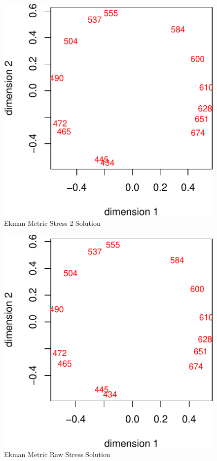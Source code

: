 \documentclass[
  12pt,
]{article}
\theoremstyle{definition}
\theoremstyle{definition}
\theoremstyle{definition}
\theoremstyle{definition}
\theoremstyle{remark}
\begin{document}
\begin{figure}

{\centering \includegraphics{stress2_files/figure-latex/ekfig1-1} 

}

\caption{Ekman Metric Stress 2 Solution}\label{fig:ekfig1}
\end{figure}

\begin{figure}

{\centering \includegraphics{stress2_files/figure-latex/ekfig2-1} 

}

\caption{Ekman Metric Raw Stress Solution}\label{fig:ekfig2}
\end{figure}
\end{document}
